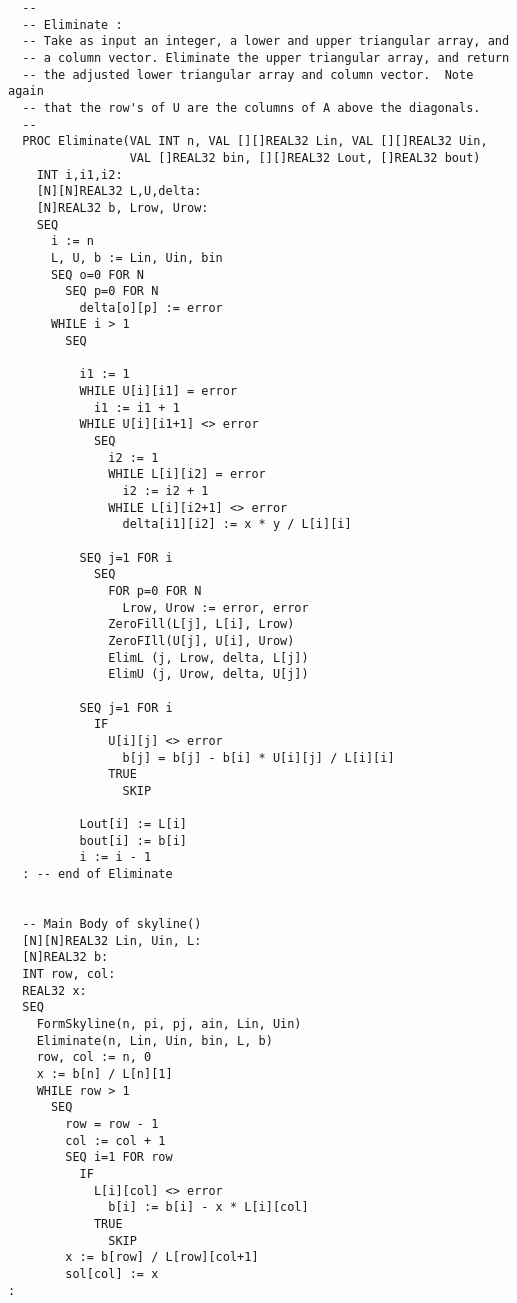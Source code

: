 \begin{small}
\begin{verbatim}
  --
  -- Eliminate :
  -- Take as input an integer, a lower and upper triangular array, and
  -- a column vector. Eliminate the upper triangular array, and return
  -- the adjusted lower triangular array and column vector.  Note again
  -- that the row's of U are the columns of A above the diagonals.
  --
  PROC Eliminate(VAL INT n, VAL [][]REAL32 Lin, VAL [][]REAL32 Uin,
                 VAL []REAL32 bin, [][]REAL32 Lout, []REAL32 bout)
    INT i,i1,i2:
    [N][N]REAL32 L,U,delta:
    [N]REAL32 b, Lrow, Urow:
    SEQ
      i := n
      L, U, b := Lin, Uin, bin
      SEQ o=0 FOR N
        SEQ p=0 FOR N
          delta[o][p] := error
      WHILE i > 1
        SEQ

          i1 := 1
          WHILE U[i][i1] = error
            i1 := i1 + 1
          WHILE U[i][i1+1] <> error
            SEQ
              i2 := 1
              WHILE L[i][i2] = error
                i2 := i2 + 1
              WHILE L[i][i2+1] <> error
                delta[i1][i2] := x * y / L[i][i]

          SEQ j=1 FOR i
            SEQ
              FOR p=0 FOR N
                Lrow, Urow := error, error
              ZeroFill(L[j], L[i], Lrow)
              ZeroFIll(U[j], U[i], Urow)
              ElimL (j, Lrow, delta, L[j])
              ElimU (j, Urow, delta, U[j])

          SEQ j=1 FOR i
            IF
              U[i][j] <> error
                b[j] = b[j] - b[i] * U[i][j] / L[i][i]
              TRUE
                SKIP

          Lout[i] := L[i]
          bout[i] := b[i]
          i := i - 1
  :	-- end of Eliminate


  -- Main Body of skyline()
  [N][N]REAL32 Lin, Uin, L:
  [N]REAL32 b:
  INT row, col:
  REAL32 x:
  SEQ
    FormSkyline(n, pi, pj, ain, Lin, Uin)
    Eliminate(n, Lin, Uin, bin, L, b)
    row, col := n, 0
    x := b[n] / L[n][1]
    WHILE row > 1
      SEQ
        row = row - 1
        col := col + 1
        SEQ i=1 FOR row
          IF
            L[i][col] <> error
              b[i] := b[i] - x * L[i][col]
            TRUE
              SKIP
        x := b[row] / L[row][col+1]
        sol[col] := x
:
\end{verbatim}
\end{small}
\setlength{\baselineskip}{3ex}
